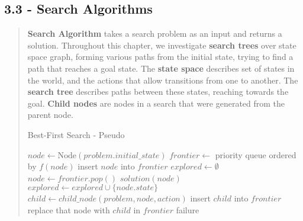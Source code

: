\documentclass{article}
\begin{document}
\subsection{3.3 - Search Algorithms}
\begin{quote}
    \textbf{Search Algorithm} takes a search problem as an input and returns a solution. Throughout this chapter, we investigate \textbf{search trees} over state space graph,
    forming various paths from the initial state, trying to find a path that reaches a goal state. The \textbf{state space} describes set of states in the world, and the actions that allow
    transitions from one to another. The \textbf{search tree} describes paths between these states, reaching towards the goal. \textbf{Child nodes} are nodes in a search that were generated from the
    parent node.

    \begin{algorithm}
        \caption{Best-First Search - Pseudo}
        \begin{algorithmic}[1]
            \State $node \gets \text{Node}(problem.initial\_state)$
            \State $frontier \gets$ priority queue ordered by $f(node)$
            \State insert $node$ into $frontier$
            \State $explored \gets \emptyset$
            \State $node \gets frontier.pop()$
            \State \Return $solution(node)$
            \EndIf
            \State $explored \gets explored \cup \{node.state\}$
            \State $child \gets child\_node(problem, node, action)$
            \State insert $child$ into $frontier$
            \State replace that node with $child$ in $frontier$
            \EndIf
            \EndFor
            \EndWhile
            \State \Return failure
            \EndFunction
        \end{algorithmic}
    \end{algorithm}


\end{quote}
\end{document}
